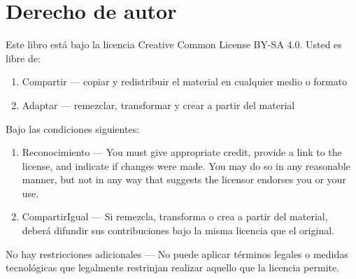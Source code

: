 \section*{Derecho de autor}

Este libro está bajo la
licencia Creative Common License BY-SA 4.0. Usted es libre de:

\begin{enumerate}
\item Compartir — copiar y redistribuir el material en cualquier medio o formato
\item Adaptar — remezclar, transformar y crear a partir del material 
\end{enumerate}

Bajo las condiciones siguientes:

\begin{enumerate}
\item Reconocimiento — You must give appropriate credit, provide a link to the license, and indicate if changes were made. You may do so in any reasonable manner, but not in any way that suggests the licensor endorses you or your use. 
\item CompartirIgual — Si remezcla, transforma o crea a partir del material, deberá difundir sus contribuciones bajo la misma licencia que el original. 
\end{enumerate}

No hay restricciones adicionales — No puede aplicar términos legales o medidas tecnológicas que legalmente restrinjan realizar aquello que la licencia permite.

